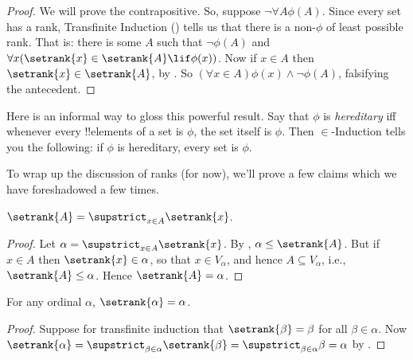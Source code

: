 \documentclass[../../../include/open-logic-section]{subfiles}
\begin{document}
\begin{proof}
We will prove the contrapositive. So, suppose $\lnot \forall A
\phi(A)$. Since every set has a rank, Transfinite Induction
() tells us that there
is a non-$\phi$ of least possible rank. That is: there is some $A$
such that $\lnot \phi(A)$ and $\forall x(\setrank{x} \in \setrank{A}
\lif \phi(x))$. Now if $x \in A$ then $\setrank{x} \in
\setrank{A}$, by . So $(\forall x \in
A)\phi(x) \land \lnot \phi(A)$, falsifying the antecedent.
\end{proof}\noindent Here is an informal way to gloss this powerful
result. Say that $\phi$ is \emph{hereditary} iff whenever every
!!{element}s of a set is $\phi$, the set itself is $\phi$. Then
$\in$-Induction tells you the following: if $\phi$ is hereditary,
every set is $\phi$.

To wrap up the discussion of ranks (for now), we'll prove a few
claims which we have foreshadowed a few times. 

\begin{prop}
$\setrank{A} = \supstrict_{x \in A}\setrank{x}$.
\end{prop}

\begin{proof}
Let $\alpha = \supstrict_{x \in A}\setrank{x}$. By
, $\alpha \leq \setrank{A}$. But if $x \in A$
then $\setrank{x} \in \alpha$, so that $x \in V_\alpha$, and hence $A
\subseteq V_\alpha$, i.e., $\setrank{A} \leq \alpha$. Hence
$\setrank{A} = \alpha$.
\end{proof}

\begin{cor}
For any ordinal $\alpha$, $\setrank{\alpha} = \alpha$.
\end{cor}

\begin{proof}
Suppose for transfinite induction that $\setrank{\beta} = \beta$ for
all $\beta \in \alpha$. Now $\setrank{\alpha} = \supstrict_{\beta \in
\alpha}\setrank{\beta} = \supstrict_{\beta \in \alpha}\beta = \alpha$
by .
%
\end{proof}
\end{document}
